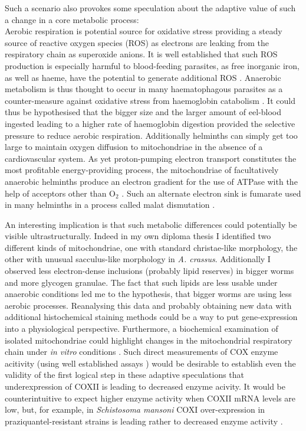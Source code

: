 Such a scenario also provokes some speculation about the adaptive
value of such a change in a core metabolic process:\\
Aerobic respiration is potential source for oxidative stress providing
a steady source of reactive oxygen species (ROS) as electrons are
leaking from the respiratory chain as superoxide anions. It is well
established that such ROS production is especially harmful to
blood-feeding parasites, as free inorganic iron, as well as haeme,
have the potential to generate additional ROS
\cite{pmid21087517}. Anaerobic metabolism is thus thought to occur in
many haematophagous parasites as a counter-measure against oxidative
stress from haemoglobin catabolism \cite{pmid12163151}. It could thus
be hypothesised that the bigger size and the larger amount of
eel-blood ingested leading to a higher rate of haemoglobin digestion
provided the selective pressure to reduce aerobic
respiration. Additionally helminths can simply get too large to
maintain oxygen diffusion to mitochondriae in the absence of a
cardiovascular system. As yet proton-pumping electron transport
constitutes the most profitable energy-providing process, the
mitochondriae of facultatively anaerobic helminths produce an electron
gradient for the use of ATPase with the help of acceptors other than
O$_2$ \cite{pmid12417132}. Such an alternate electron sink is fumarate
used in many helminths in a process called malat dismutation
\cite{pmid15275412}.

An interesting implication is that such metabolic differences could
potentially be visible ultrastructurally. Indeed in my own diploma
thesis \cite{heitlinger_vergleichende_2008} I identified two different
kinds of mitochondriae, one with standard christae-like morphology,
the other with unusual sacculus-like morphology in
\textit{A. crassus}. Additionally I observed less electron-dense
inclusions (probably lipid reserves) in bigger worms and more glycogen
granulae. The fact that such lipids are less usable under anaerobic
conditions led me to the hypothesis, that bigger worms are using less
aerobic processes. Reanalysing this data and probably obtaining new
data with additional histochemical staining methods could be a way to
put gene-expression into a physiological perspective. Furthermore, a
biochemical examination of isolated mitochondriae could highlight
changes in the mitochondrial respiratory chain under \textit{in vitro}
conditions \cite{pmid18314717}. Such direct measurements of COX enzyme
acitivity (using well established assays \cite{pmid8592440}) would be
desirable to establish even the validity of the first logical step in
these adaptive speculations that underexpression of COXII is leading
to decreased enzyme acivity. It would be counterintuitive to expect
higher enzyme activity when COXII mRNA levels are low, but, for
example, in \textit{Schistosoma mansoni} COXI over-expression in
praziquantel-resistant strains is leading rather to decreased enzyme
activity \cite{pmid9695101}.

